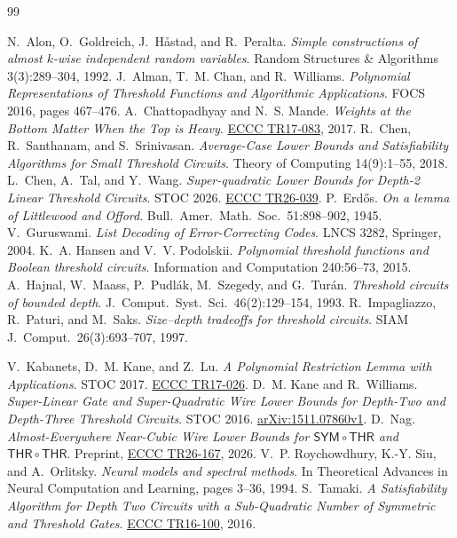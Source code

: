 \documentclass[11pt,letterpaper]{article}
\theoremstyle{remark}
\newcommand{\THR}{\mathsf{THR}}
\begin{document}
\renewcommand{\refname}{\texorpdfstring{\color{ink}References}{References}}
\begin{thebibliography}{99}\setlength{\itemsep}{0pt}\footnotesize

 N.~Alon, O.~Goldreich, J.~H{\aa}stad, and R.~Peralta.
\emph{Simple constructions of almost $k$-wise independent random variables}.
Random Structures \& Algorithms 3(3):289--304, 1992.
 J.~Alman, T.~M. Chan, and R.~Williams.
\emph{Polynomial Representations of Threshold Functions and Algorithmic
Applications}. FOCS 2016, pages 467--476.
 A.~Chattopadhyay and N.~S. Mande.
\emph{Weights at the Bottom Matter When the Top is Heavy}.
\href{https://eccc.weizmann.ac.il/report/2017/083/}{ECCC TR17-083}, 2017.
 R.~Chen, R.~Santhanam, and S.~Srinivasan.
\emph{Average-Case Lower Bounds and Satisfiability Algorithms for Small
Threshold Circuits}. Theory of Computing 14(9):1--55, 2018.
 L.~Chen, A.~Tal, and Y.~Wang.
\emph{Super-quadratic Lower Bounds for Depth-2 Linear Threshold Circuits}.
STOC 2026. \href{https://eccc.weizmann.ac.il/report/2026/039/}{ECCC TR26-039}.
 P.~Erd\H{o}s. \emph{On a lemma of Littlewood and Offord}.
Bull.\ Amer.\ Math.\ Soc.\ 51:898--902, 1945.
 V.~Guruswami. \emph{List Decoding of Error-Correcting Codes}.
LNCS 3282, Springer, 2004.
 K.~A. Hansen and V.~V. Podolskii. \emph{Polynomial threshold
functions and Boolean threshold circuits}. Information and Computation
240:56--73, 2015.
 A.~Hajnal, W.~Maass, P.~Pudl\'ak, M.~Szegedy, and
G.~Tur\'an. \emph{Threshold circuits of bounded depth}. J.\ Comput.\ Syst.\
Sci.\ 46(2):129--154, 1993.
 R.~Impagliazzo, R.~Paturi, and M.~Saks. \emph{Size--depth tradeoffs for threshold circuits}. SIAM J.\ Comput.\ 26(3):693--707, 1997.

 V.~Kabanets, D.~M. Kane, and Z.~Lu.
\emph{A Polynomial Restriction Lemma with Applications}. STOC 2017.
\href{https://eccc.weizmann.ac.il/report/2017/026/}{ECCC TR17-026}.
\bibitem{KW} D.~M. Kane and R.~Williams.
\emph{Super-Linear Gate and Super-Quadratic Wire Lower Bounds for Depth-Two
and Depth-Three Threshold Circuits}. STOC 2016.
\href{https://arxiv.org/abs/1511.07860}{arXiv:1511.07860v1}.
 D.~Nag. \emph{Almost-Everywhere Near-Cubic Wire Lower Bounds for
$\mathsf{SYM}\circ\THR$ and $\THR\circ\THR$}. Preprint,
\href{https://eccc.weizmann.ac.il/report/2026/167/}{ECCC TR26-167}, 2026.
\bibitem{RSO} V.~P. Roychowdhury, K.-Y. Siu, and A.~Orlitsky.
\emph{Neural models and spectral methods}. In Theoretical Advances in Neural
Computation and Learning, pages 3--36, 1994.
 S.~Tamaki. \emph{A Satisfiability Algorithm for Depth Two
Circuits with a Sub-Quadratic Number of Symmetric and Threshold Gates}.
\href{https://eccc.weizmann.ac.il/report/2016/100/}{ECCC TR16-100}, 2016.
\end{thebibliography}
\end{document}
